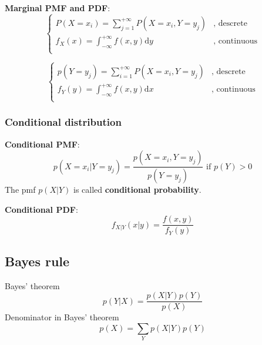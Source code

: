 \textbf{Marginal PMF and PDF}:
\begin{equation} \begin{cases}
P(X=x_i)=\sum_{j=1}^{+\infty}P(X=x_i,Y=y_j) & \text{, descrete}\\
f_X(x)=\int_{-\infty}^{+\infty} f(x,y)\mathrm{d}y & \text{, continuous}\\
\end{cases}\end{equation}

\begin{equation}\begin{cases}
p(Y=y_j)=\sum_{i=1}^{+\infty}P(X=x_i,Y=y_j) & \text{, descrete}\\
f_Y(y)=\int_{-\infty}^{+\infty} f(x,y)\mathrm{d}x & \text{, continuous}\\
\end{cases}\end{equation}


\subsubsection{Conditional distribution}
\textbf{Conditional PMF}:
\begin{equation}
p(X=x_i|Y=y_j)=\dfrac{p(X=x_i,Y=y_j)}{p(Y=y_j)} \text{ if } p(Y)>0
\end{equation}
The pmf $p(X|Y)$ is called \textbf{conditional probability}.

\textbf{Conditional PDF}:
\begin{equation}
f_{X|Y}(x|y)=\dfrac{f(x,y)}{f_Y(y)}
\end{equation}

\subsection{Bayes rule}

Bayes' theorem
\begin{equation}
                                  p(Y|X) = \frac{p(X|Y)p(Y)}{p(X)}
\end{equation}
Denominator in Bayes' theorem
\begin{equation}
                                  p(X) = \sum_Y{p(X|Y)p(Y)}
\end{equation}


